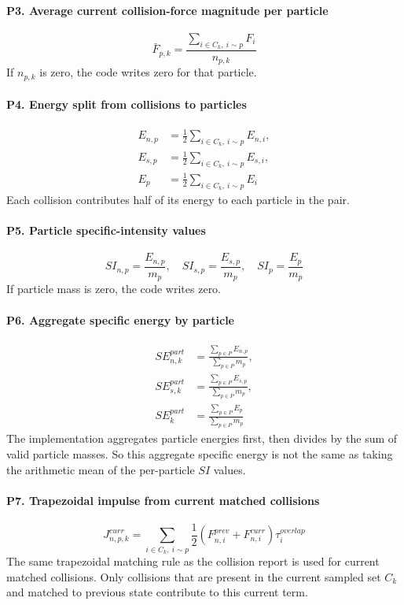 \documentclass[11pt,a4paper]{article}
\begin{document}
\paragraph{P3. Average current collision-force magnitude per particle}
\[
\bar{F}_{p,k} = \frac{\sum_{i \in C_k,\ i \sim p} F_i}{n_{p,k}}
\]
If $n_{p,k}$ is zero, the code writes zero for that particle.

\paragraph{P4. Energy split from collisions to particles}
\[
\begin{aligned}
E_{n,p} &= \frac{1}{2}\sum_{i \in C_k,\ i \sim p} E_{n,i}, \\
E_{s,p} &= \frac{1}{2}\sum_{i \in C_k,\ i \sim p} E_{s,i}, \\
E_p &= \frac{1}{2}\sum_{i \in C_k,\ i \sim p} E_i
\end{aligned}
\]
Each collision contributes half of its energy to each particle in the pair.

\paragraph{P5. Particle specific-intensity values}
\[
SI_{n,p} = \frac{E_{n,p}}{m_p},\quad SI_{s,p} = \frac{E_{s,p}}{m_p},\quad SI_p = \frac{E_p}{m_p}
\]
If particle mass is zero, the code writes zero.

\paragraph{P6. Aggregate specific energy by particle}
\[
\begin{aligned}
SE_{n,k}^{part} &= \frac{\sum_{p \in P} E_{n,p}}{\sum_{p \in P} m_p}, \\
SE_{s,k}^{part} &= \frac{\sum_{p \in P} E_{s,p}}{\sum_{p \in P} m_p}, \\
SE_k^{part} &= \frac{\sum_{p \in P} E_p}{\sum_{p \in P} m_p}
\end{aligned}
\]
The implementation aggregates particle energies first, then divides by the sum of valid particle masses.
So this aggregate specific energy is not the same as taking the arithmetic mean of the per-particle $SI$ values.

\paragraph{P7. Trapezoidal impulse from current matched collisions}
\[
J_{n,p,k}^{curr} = \sum_{i \in C_k,\ i \sim p} \frac{1}{2}\left(F_{n,i}^{prev} + F_{n,i}^{curr}\right)\tau_i^{overlap}
\]
The same trapezoidal matching rule as the collision report is used for current matched collisions.
Only collisions that are present in the current sampled set $C_k$ and matched to previous state contribute to this current term.
\end{document}
